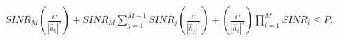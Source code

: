 \documentclass[preview]{standalone}
\begin{document}
\begin{align*}
SINR_M \left( \frac{C}{\left|{\hat{h}_k}\right|^2} \right) + SINR_M \sum_{j=1}^{M-1} SINR_j \left( \frac{C}{\left|{\hat{h}_j}\right|^2} \right) + \left( \frac{C}{\left|{\hat{h}_1}\right|^2} \right) \prod_{i=1}^{M} SINR_i \leq P.
\end{align*}
\end{document}
